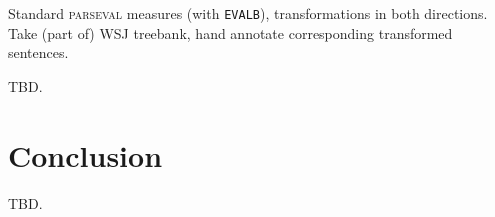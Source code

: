 \documentclass[a4paper]{article}
\theoremstyle{definition}
\begin{document}
Standard \textsc{parseval} measures (with \texttt{EVALB}), transformations in both
directions. Take (part of) WSJ treebank, hand annotate corresponding transformed
sentences.

TBD. 

\section{Conclusion}

TBD.

\label{sec:conc}


%


\end{document}
